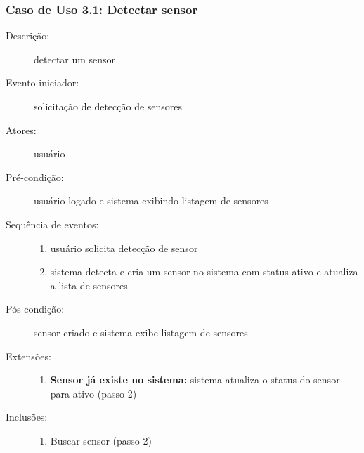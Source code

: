 \subsubsection{Caso de Uso 3.1: Detectar sensor}
\begin{description}
	\item[Descrição:] detectar um sensor
	\item[Evento iniciador:] solicitação de detecção de sensores
	\item[Atores:] usuário
	\item[Pré-condição:] usuário logado e sistema exibindo listagem de sensores
	\item[Sequência de eventos:] \hfill
		\begin{enumerate}
			\item{usuário solicita detecção de sensor}
			\item{sistema detecta e cria um sensor no sistema com status ativo e atualiza a lista de sensores}
		\end{enumerate}
	\item[Pós-condição:] sensor criado e sistema exibe listagem de sensores
	\item[Extensões:] \hfill
		\begin{enumerate}
			\item{\textbf{Sensor já existe no sistema:} sistema atualiza o status do sensor para ativo (passo 2)}
		\end{enumerate}
	\item[Inclusões:] \hfill
		\begin{enumerate}
			\item{Buscar sensor (passo 2)}
		\end{enumerate}
\end{description}
%
